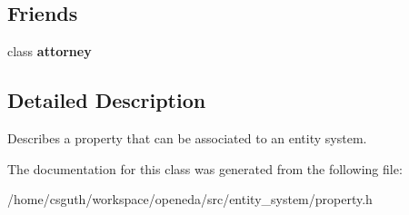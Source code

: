 \subsection*{Friends}
\begin{DoxyCompactItemize}
\item 
\hypertarget{classophidian_1_1entity__system_1_1property_aa7d5fec7c293c7cce3170821ee443005}{class {\bfseries attorney}}\label{classophidian_1_1entity__system_1_1property_aa7d5fec7c293c7cce3170821ee443005}

\end{DoxyCompactItemize}


\subsection{Detailed Description}
Describes a property that can be associated to an entity system. 

The documentation for this class was generated from the following file\-:\begin{DoxyCompactItemize}
\item 
/home/csguth/workspace/openeda/src/entity\-\_\-system/property.\-h\end{DoxyCompactItemize}
